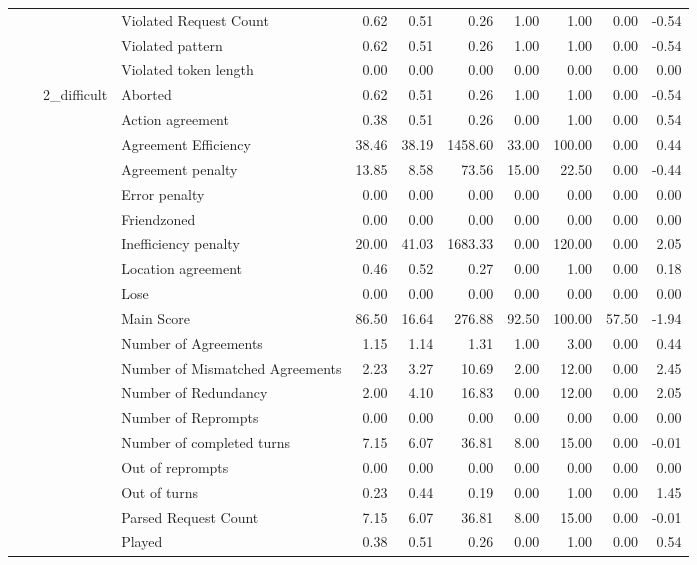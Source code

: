 \begin{tabular}{llllrrrrrrr}
 &  &  & Violated Request Count & 0.62 & 0.51 & 0.26 & 1.00 & 1.00 & 0.00 & -0.54 \\
 &  &  & Violated pattern & 0.62 & 0.51 & 0.26 & 1.00 & 1.00 & 0.00 & -0.54 \\
 &  &  & Violated token length & 0.00 & 0.00 & 0.00 & 0.00 & 0.00 & 0.00 & 0.00 \\
\cline{3-11}
 &  & \multirow[t]{27}{*}{2_difficult} & Aborted & 0.62 & 0.51 & 0.26 & 1.00 & 1.00 & 0.00 & -0.54 \\
 &  &  & Action agreement & 0.38 & 0.51 & 0.26 & 0.00 & 1.00 & 0.00 & 0.54 \\
 &  &  & Agreement Efficiency & 38.46 & 38.19 & 1458.60 & 33.00 & 100.00 & 0.00 & 0.44 \\
 &  &  & Agreement penalty & 13.85 & 8.58 & 73.56 & 15.00 & 22.50 & 0.00 & -0.44 \\
 &  &  & Error penalty & 0.00 & 0.00 & 0.00 & 0.00 & 0.00 & 0.00 & 0.00 \\
 &  &  & Friendzoned & 0.00 & 0.00 & 0.00 & 0.00 & 0.00 & 0.00 & 0.00 \\
 &  &  & Inefficiency penalty & 20.00 & 41.03 & 1683.33 & 0.00 & 120.00 & 0.00 & 2.05 \\
 &  &  & Location agreement & 0.46 & 0.52 & 0.27 & 0.00 & 1.00 & 0.00 & 0.18 \\
 &  &  & Lose & 0.00 & 0.00 & 0.00 & 0.00 & 0.00 & 0.00 & 0.00 \\
 &  &  & Main Score & 86.50 & 16.64 & 276.88 & 92.50 & 100.00 & 57.50 & -1.94 \\
 &  &  & Number of Agreements & 1.15 & 1.14 & 1.31 & 1.00 & 3.00 & 0.00 & 0.44 \\
 &  &  & Number of Mismatched Agreements & 2.23 & 3.27 & 10.69 & 2.00 & 12.00 & 0.00 & 2.45 \\
 &  &  & Number of Redundancy & 2.00 & 4.10 & 16.83 & 0.00 & 12.00 & 0.00 & 2.05 \\
 &  &  & Number of Reprompts & 0.00 & 0.00 & 0.00 & 0.00 & 0.00 & 0.00 & 0.00 \\
 &  &  & Number of completed turns & 7.15 & 6.07 & 36.81 & 8.00 & 15.00 & 0.00 & -0.01 \\
 &  &  & Out of reprompts & 0.00 & 0.00 & 0.00 & 0.00 & 0.00 & 0.00 & 0.00 \\
 &  &  & Out of turns & 0.23 & 0.44 & 0.19 & 0.00 & 1.00 & 0.00 & 1.45 \\
 &  &  & Parsed Request Count & 7.15 & 6.07 & 36.81 & 8.00 & 15.00 & 0.00 & -0.01 \\
 &  &  & Played & 0.38 & 0.51 & 0.26 & 0.00 & 1.00 & 0.00 & 0.54 \\

\end{tabular}
